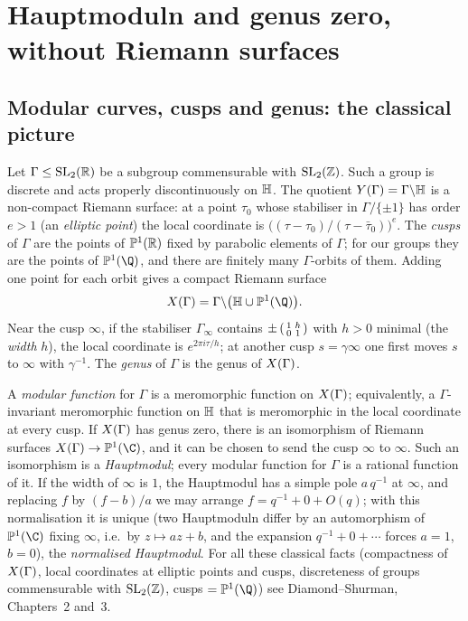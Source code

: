 \section{Hauptmoduln and genus zero, without Riemann surfaces}\label{ch16:sec:haupt}

\subsection{Modular curves, cusps and genus: the classical picture}

Let $\Gamma\le\mathrm{SL}_2(\mathbb{R})$ be a subgroup commensurable with $\mathrm{SL}_2(\mathbb{Z})$.  Such a group is discrete and acts
properly discontinuously on $\mathbb{H}$.  The quotient $Y(\Gamma)=\Gamma\backslash\mathbb{H}$ is a non-compact
Riemann surface: at a point $\tau_0$ whose stabiliser in $\Gamma/\{\pm1\}$ has order $e>1$ (an \emph{elliptic point})
the local coordinate is $\bigl((\tau-\tau_0)/(\tau-\bar\tau_0)\bigr)^e$.  The \emph{cusps} of $\Gamma$ are the points of
$\mathbb{P}^1(\mathbb{R})$ fixed by parabolic elements of $\Gamma$; for our groups they are the points of $\chsixteenP(\Q)$, and
there are finitely many $\Gamma$-orbits of them.  Adding one point for each orbit gives a compact Riemann surface
\begin{equation*}
  \chsixteenX=\Gamma\backslash\bigl(\chsixteenH\cup\chsixteenP(\Q)\bigr).
\end{equation*}
Near the cusp $\infty$, if the stabiliser $\Gamma_\infty$ contains $\pm\left(\begin{smallmatrix}1&h\\0&1\end{smallmatrix}\right)$ with $h>0$ minimal (the
\emph{width} $h$), the local coordinate is $e^{2\pi i\tau/h}$; at another cusp $s=\gamma\infty$ one first moves $s$ to
$\infty$ with $\gamma^{-1}$.  The \emph{genus} of $\Gamma$ is the genus of $X(\Gamma)$.

A \emph{modular function} for $\Gamma$ is a meromorphic function on $X(\Gamma)$; equivalently, a $\Gamma$-invariant
meromorphic function on $\mathbb{H}$ that is meromorphic in the local coordinate at every cusp.  If $X(\Gamma)$
has genus zero, there is an isomorphism of Riemann surfaces $\chsixteenX\to\chsixteenP(\C)$, and it can be chosen to
send the cusp $\infty$ to $\infty$.  Such an isomorphism is a \emph{Hauptmodul}; every modular function for $\Gamma$ is
a rational function of it.  If the width of $\infty$ is $1$, the Hauptmodul has a simple pole $a\,q^{-1}$ at $\infty$,
and replacing $f$ by $(f-b)/a$ we may arrange $f=q^{-1}+0+O(q)$; with this normalisation it is unique (two
Hauptmoduln differ by an automorphism of $\chsixteenP(\C)$ fixing $\infty$, i.e.\ by $z\mapsto az+b$, and the
expansion $q^{-1}+0+\cdots$ forces $a=1$, $b=0$), the \emph{normalised Hauptmodul}.  For all these classical facts
(compactness of $X(\Gamma)$, local coordinates at elliptic points and cusps, discreteness of groups commensurable
with $\mathrm{SL}_2(\mathbb{Z})$, cusps $=\chsixteenP(\Q)$) see Diamond--Shurman, Chapters~2 and~3.

